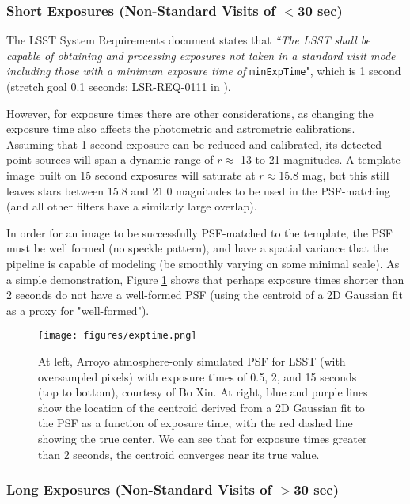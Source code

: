 \subsubsection{Short Exposures (Non-Standard Visits of $<$30 sec)}

The LSST System Requirements document states that {\it ``The LSST shall be capable of 
obtaining and processing exposures not taken in a standard visit mode including those 
with a minimum exposure time of} {\tt minExpTime}", which is 1 second (stretch goal 0.1 
seconds; LSR-REQ-0111 in ).

However, for exposure times there are other considerations, as changing the exposure time 
also affects the photometric and astrometric calibrations.
Assuming that 1 second exposure can be reduced and calibrated, its detected point sources 
will span a dynamic range of $r$$\approx$ 13 to 21 magnitudes.
A template image built on 15 second exposures will saturate at $r$$\approx$15.8 mag, but 
this still leaves stars between 15.8 and 21.0 magnitudes to be used in the PSF-matching 
(and all other filters have a similarly large overlap).

In order for an image to be successfully PSF-matched to the template, the PSF must be 
well formed (no speckle pattern), and have a spatial variance that the pipeline is 
capable of modeling (be smoothly varying on some minimal scale).
As a simple demonstration, Figure \ref{fig:expt} shows that perhaps exposure times 
shorter than $2$ seconds do not have a well-formed PSF (using the centroid of a 2D 
Gaussian fit as a proxy for "well-formed").

\begin{figure}
\begin{center}
\texttt{[image: figures/exptime.png]}
\caption{At left, Arroyo atmosphere-only simulated PSF for LSST (with oversampled pixels) 
with exposure times of 0.5, 2, and 15 seconds (top to bottom), courtesy of Bo Xin. At 
right, blue and purple lines show the location of the centroid derived from a 2D Gaussian 
fit to the PSF as a function of exposure time, with the red dashed line showing the true 
center. We can see that for exposure times greater than 2 seconds, the centroid converges 
near its true value. \label{fig:expt}}
\end{center}
\end{figure}

\subsubsection{Long Exposures (Non-Standard Visits of $>$30 sec)}


